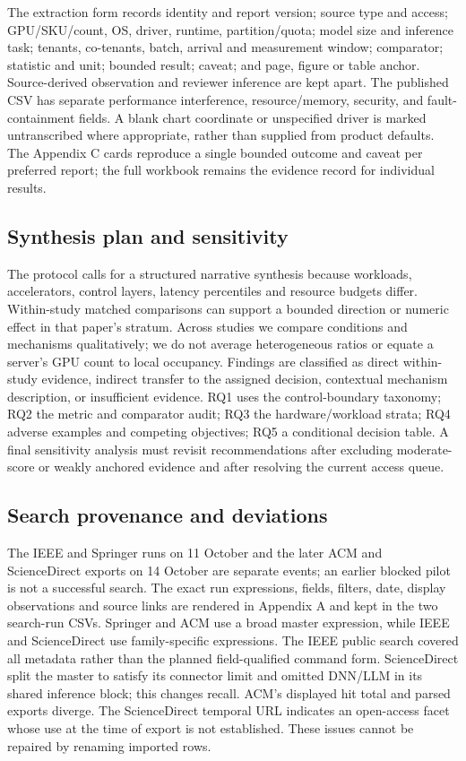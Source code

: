 The extraction form records identity and report version; source type and access; GPU/SKU/count, OS, driver, runtime, partition/quota; model size and inference task; tenants, co-tenants, batch, arrival and measurement window; comparator; statistic and unit; bounded result; caveat; and page, figure or table anchor. Source-derived observation and reviewer inference are kept apart. The published CSV has separate performance interference, resource/memory, security, and fault-containment fields. A blank chart coordinate or unspecified driver is marked untranscribed where appropriate, rather than supplied from product defaults. The Appendix C cards reproduce a single bounded outcome and caveat per preferred report; the full workbook remains the evidence record for individual results.

\subsection{Synthesis plan and sensitivity}
The protocol calls for a structured narrative synthesis because workloads, accelerators, control layers, latency percentiles and resource budgets differ. Within-study matched comparisons can support a bounded direction or numeric effect in that paper's stratum. Across studies we compare conditions and mechanisms qualitatively; we do not average heterogeneous ratios or equate a server's GPU count to local occupancy. Findings are classified as direct within-study evidence, indirect transfer to the assigned decision, contextual mechanism description, or insufficient evidence. RQ1 uses the control-boundary taxonomy; RQ2 the metric and comparator audit; RQ3 the hardware/workload strata; RQ4 adverse examples and competing objectives; RQ5 a conditional decision table. A final sensitivity analysis must revisit recommendations after excluding moderate-score or weakly anchored evidence and after resolving the current access queue. 

\subsection{Search provenance and deviations}
The IEEE and Springer runs on 11 October and the later ACM and ScienceDirect exports on 14 October are separate events; an earlier blocked pilot is not a successful search. The exact run expressions, fields, filters, date, display observations and source links are rendered in Appendix A and kept in the two search-run CSVs. Springer and ACM use a broad master expression, while IEEE and ScienceDirect use family-specific expressions. The IEEE public search covered all metadata rather than the planned field-qualified command form. ScienceDirect split the master to satisfy its connector limit and omitted DNN/LLM in its shared inference block; this changes recall. ACM's displayed hit total and parsed exports diverge. The ScienceDirect temporal URL indicates an open-access facet whose use at the time of export is not established. These issues cannot be repaired by renaming imported rows. 
